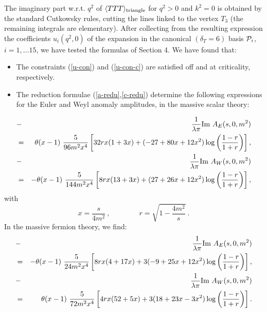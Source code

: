 \documentclass[11pt]{article}
\newcommand{\beq}{\begin{equation}}
\newcommand{\eeq}{\end{equation}}
\newcommand{\bea}{\begin{eqnarray}}
\newcommand{\eea}{\end{eqnarray}}
\def\Im{\hbox{\rm Im\ }}
\def\nl{\nonumber\\}
\def\bh{\!\!\!\!\!\!}
\def\TTT{\bra TTT\ket}
\def\bra{\langle}
\def\ket{\rangle}
\def\dt{{\delta_T}} %
\begin{document}
The imaginary part w.r.t. $q^2$ of $\TTT_{{\rm triangle}}$ 
for $q^2>0$ and $k^2=0$
is  obtained by the standard Cutkowsky rules, cutting the lines 
linked to the vertex $T_3$ (the remaining integrals  are elementary).
After collecting from the resulting expression
the coefficients $u_i(q^2,0)$ of the expansion in the canonical $(\dt=6)$ 
basis ${\cal P}_i$, $i=1,\dots15$, we have tested the formulas of Section 4.
We have found that:
\begin{itemize}
\item 
The constraints (\ref{u-con}) and (\ref{u-con-c}) are satisfied 
off and at criticality, respectively.
\item
The reduction formulae (\ref{a-redu},\ref{c-redu}) determine
the following expressions for the Euler and Weyl anomaly amplitudes,
in the massive scalar theory:
\end{itemize}
\bea
&-& {1\over \lambda\pi} \Im A_E(s,0,m^2) \nl
\bh\bh\bh &=& 
\theta(x-1)\ \frac{5}{96 m^2 x^4} \left[
32 r x (1+3x) +(-27 +80 x +12 x^2)\log\left(\frac{1-r}{1+r}\right)
\right] ,
\label{bose-a}\\
&-& {1\over \lambda\pi} \Im A_W(s,0,m^2) \nl
\bh\bh\bh &=& 
- \theta(x-1)\ \frac{5}{144 m^2 x^4} \left[
8 r x (13+3x) +(27 +26 x +12 x^2)\log\left(\frac{1-r}{1+r}\right)
\right] ,
\label{bose-c}
\eea
with
\beq
x= \frac{s}{4m^2}\ ,\qquad\qquad r=\sqrt{1-\frac{4m^2}{s}}\ .
\eeq
In the massive fermion theory, we find:
\bea
&-& {1\over \lambda\pi} \Im A_E(s,0,m^2) \nl
\bh\bh\bh &=&
- \theta(x-1)\ \frac{5}{24 m^2 x^4} \left[
8 r x (4+17x) +3(-9 +25 x +12 x^2)\log\left(\frac{1-r}{1+r}\right)
\right] ,
\label{fermi-a}\\
&-& {1\over \lambda\pi} \Im A_W(s,0,m^2) \nl
\bh\bh\bh &=&
\theta(x-1)\  \frac{5}{72 m^2 x^4} \left[
4 r x (52+5x) +3(18 +23 x -3 x^2)\log\left(\frac{1-r}{1+r}\right)
\right] .
\label{fermi-c}
\eea
\end{document}
